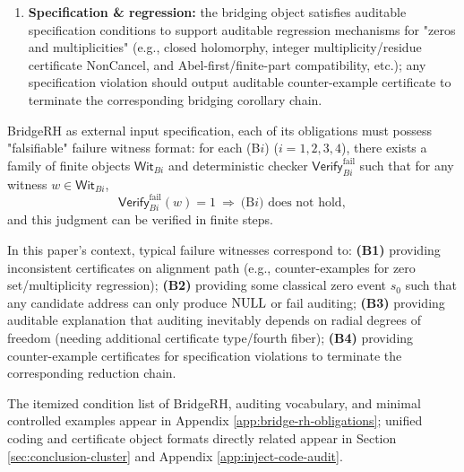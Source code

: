 \begin{assumption}
\begin{enumerate}[label=(B\arabic*), ref=B\arabic*]
  \item \label{bridge:b4}
  \textnormal{\textbf{Specification \& regression:}} the bridging object satisfies auditable specification conditions to support auditable regression mechanisms for "zeros and multiplicities" (e.g., closed holomorphy, integer multiplicity/residue certificate NonCancel, and Abel-first/finite-part compatibility, etc.); any specification violation should output auditable counter-example certificate to terminate the corresponding bridging corollary chain.\par
\end{enumerate}
\end{assumption}

\begin{definition}\label{def:bridge-failure-witness}
BridgeRH as external input specification, each of its obligations must possess "falsifiable" failure witness format: for each (B$i$) ($i=1,2,3,4$), there exists a family of finite objects $\mathsf{Wit}_{B i}$ and deterministic checker $\mathsf{Verify}_{B i}^{\mathrm{fail}}$ such that for any witness $w\in\mathsf{Wit}_{B i}$,
$$
\mathsf{Verify}_{B i}^{\mathrm{fail}}(w)=1\ \Longrightarrow\ \text{(B$i$) does not hold},
$$
and this judgment can be verified in finite steps.\par
In this paper's context, typical failure witnesses correspond to: \textbf{(B1)} providing inconsistent certificates on alignment path (e.g., counter-examples for zero set/multiplicity regression); \textbf{(B2)} providing some classical zero event $s_0$ such that any candidate address can only produce $\mathrm{NULL}$ or fail auditing; \textbf{(B3)} providing auditable explanation that auditing inevitably depends on radial degrees of freedom (needing additional certificate type/fourth fiber); \textbf{(B4)} providing counter-example certificates for specification violations to terminate the corresponding reduction chain.\par
\end{definition}

The itemized condition list of BridgeRH, auditing vocabulary, and minimal controlled examples appear in Appendix \ref{app:bridge-rh-obligations}; unified coding and certificate object formats directly related appear in Section \ref{sec:conclusion-cluster} and Appendix \ref{app:inject-code-audit}.\par

